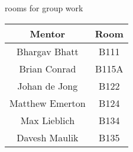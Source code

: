 \documentclass[letterpaper,11pt]{article}
\begin{document}
\begin{landscape}
\begin{center}
\end{center}

\vspace{10pt}

\begin{center}
\parbox{3in}{\centering
{\large rooms for group work}

\begin{tabular}{cc}
Mentor & Room \\
\midrule
Bhargav Bhatt & B111 \\
Brian Conrad & B115A \\
Johan de Jong & B122 \\
Matthew Emerton & B124 \\
Max Lieblich & B134 \\
Davesh Maulik & B135
\end{tabular}
}
\end{center}

\end{landscape}
\end{document}

